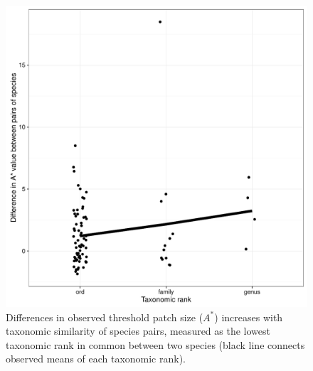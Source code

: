 \begin{figure}[htbp]
\centering
\includegraphics[width=5.5in]{figures/astar.pdf}
\caption[Differences in observed
threshold patch size (\(A^{*}\)) increases with taxonomic similarity]{Differences in observed
threshold patch size (\(A^{*}\)) increases with taxonomic similarity
of species pairs, measured as the lowest taxonomic rank in common
between two species (black line connects observed means of each
taxonomic rank).}
\label{fig:astar_taxo}
\end{figure}

